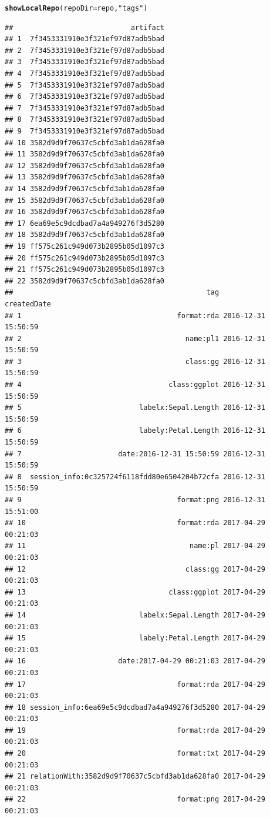\documentclass[nojss]{jss}\usepackage[]{graphicx}\usepackage[]{color}
\makeatletter
\newcommand{\hlstr}[1]{\textcolor[rgb]{0.192,0.494,0.8}{#1}}%
\newcommand{\hlstd}[1]{\textcolor[rgb]{0.345,0.345,0.345}{#1}}%
\newcommand{\hlkwc}[1]{\textcolor[rgb]{0.333,0.667,0.333}{#1}}%
\newcommand{\hlkwd}[1]{\textcolor[rgb]{0.737,0.353,0.396}{\textbf{#1}}}%
\newenvironment{kframe}{%
 \def\at@end@of@kframe{}%
 \ifinner\ifhmode%
  \def\at@end@of@kframe{\end{minipage}}%
  \begin{minipage}{\columnwidth}%
 \fi\fi%
 \def\FrameCommand##1{\hskip\@totalleftmargin \hskip-\fboxsep
 \colorbox{shadecolor}{##1}\hskip-\fboxsep
     \hskip-\linewidth \hskip-\@totalleftmargin \hskip\columnwidth}%
 \MakeFramed {\advance\hsize-\width
   \@totalleftmargin\z@ \linewidth\hsize
   \@setminipage}}%
 {\par\unskip\endMakeFramed%
 \at@end@of@kframe}
\newenvironment{knitrout}{}{} %
\makeatother
\begin{document}
\begin{knitrout}
\color{fgcolor}\begin{kframe}
\begin{alltt}
\hlkwd{showLocalRepo}\hlstd{(}\hlkwc{repoDir} \hlstd{= repo,} \hlstr{"tags"}\hlstd{)}
\end{alltt}
\begin{verbatim}
##                            artifact
## 1  7f3453331910e3f321ef97d87adb5bad
## 2  7f3453331910e3f321ef97d87adb5bad
## 3  7f3453331910e3f321ef97d87adb5bad
## 4  7f3453331910e3f321ef97d87adb5bad
## 5  7f3453331910e3f321ef97d87adb5bad
## 6  7f3453331910e3f321ef97d87adb5bad
## 7  7f3453331910e3f321ef97d87adb5bad
## 8  7f3453331910e3f321ef97d87adb5bad
## 9  7f3453331910e3f321ef97d87adb5bad
## 10 3582d9d9f70637c5cbfd3ab1da628fa0
## 11 3582d9d9f70637c5cbfd3ab1da628fa0
## 12 3582d9d9f70637c5cbfd3ab1da628fa0
## 13 3582d9d9f70637c5cbfd3ab1da628fa0
## 14 3582d9d9f70637c5cbfd3ab1da628fa0
## 15 3582d9d9f70637c5cbfd3ab1da628fa0
## 16 3582d9d9f70637c5cbfd3ab1da628fa0
## 17 6ea69e5c9dcdbad7a4a949276f3d5280
## 18 3582d9d9f70637c5cbfd3ab1da628fa0
## 19 ff575c261c949d073b2895b05d1097c3
## 20 ff575c261c949d073b2895b05d1097c3
## 21 ff575c261c949d073b2895b05d1097c3
## 22 3582d9d9f70637c5cbfd3ab1da628fa0
##                                              tag         createdDate
## 1                                     format:rda 2016-12-31 15:50:59
## 2                                       name:pl1 2016-12-31 15:50:59
## 3                                       class:gg 2016-12-31 15:50:59
## 4                                   class:ggplot 2016-12-31 15:50:59
## 5                            labelx:Sepal.Length 2016-12-31 15:50:59
## 6                            labely:Petal.Length 2016-12-31 15:50:59
## 7                       date:2016-12-31 15:50:59 2016-12-31 15:50:59
## 8  session_info:0c325724f6118fdd80e6504204b72cfa 2016-12-31 15:50:59
## 9                                     format:png 2016-12-31 15:51:00
## 10                                    format:rda 2017-04-29 00:21:03
## 11                                       name:pl 2017-04-29 00:21:03
## 12                                      class:gg 2017-04-29 00:21:03
## 13                                  class:ggplot 2017-04-29 00:21:03
## 14                           labelx:Sepal.Length 2017-04-29 00:21:03
## 15                           labely:Petal.Length 2017-04-29 00:21:03
## 16                      date:2017-04-29 00:21:03 2017-04-29 00:21:03
## 17                                    format:rda 2017-04-29 00:21:03
## 18 session_info:6ea69e5c9dcdbad7a4a949276f3d5280 2017-04-29 00:21:03
## 19                                    format:rda 2017-04-29 00:21:03
## 20                                    format:txt 2017-04-29 00:21:03
## 21 relationWith:3582d9d9f70637c5cbfd3ab1da628fa0 2017-04-29 00:21:03
## 22                                    format:png 2017-04-29 00:21:03
\end{verbatim}
\end{kframe}
\end{knitrout}
\end{document}
